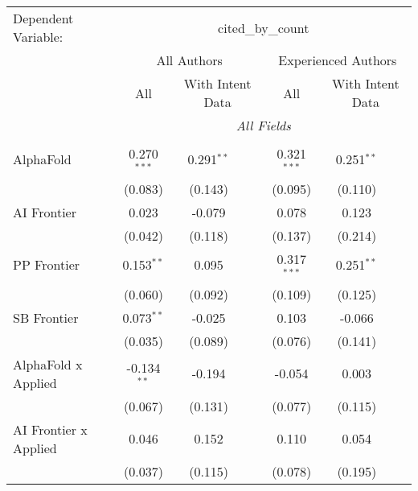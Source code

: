 \begingroup
\centering
\begin{tabular}{lcccccc}
   \tabularnewline \midrule \midrule
   Dependent Variable: & \multicolumn{6}{c}{cited\_by\_count}\\
 & \multicolumn{3}{c}{All Authors} & \multicolumn{3}{c}{Experienced Authors} \\
\cmidrule(lr){2-4} \cmidrule(lr){5-7}
 & \multicolumn{1}{c}{All} & \multicolumn{2}{c}{With Intent Data} & \multicolumn{1}{c}{All} & \multicolumn{2}{c}{With Intent Data} \\
\cmidrule(lr){2-2} \cmidrule(lr){3-4} \cmidrule(lr){5-5} \cmidrule(lr){6-7}
 & \multicolumn{6}{c}{\textit{All Fields}} \\ \\
   AlphaFold                      & 0.270$^{***}$ & 0.291$^{**}$ &                & 0.321$^{***}$ & 0.251$^{**}$ &   \\   
                                  & (0.083)       & (0.143)      &                & (0.095)       & (0.110)      &   \\   
   AI Frontier                    & 0.023         & -0.079       &                & 0.078         & 0.123        &   \\   
                                  & (0.042)       & (0.118)      &                & (0.137)       & (0.214)      &   \\   
   PP Frontier                    & 0.153$^{**}$  & 0.095        &                & 0.317$^{***}$ & 0.251$^{**}$ &   \\   
                                  & (0.060)       & (0.092)      &                & (0.109)       & (0.125)      &   \\   
   SB Frontier                    & 0.073$^{**}$  & -0.025       &                & 0.103         & -0.066       &   \\   
                                  & (0.035)       & (0.089)      &                & (0.076)       & (0.141)      &   \\   
   AlphaFold x Applied            & -0.134$^{**}$ & -0.194       &                & -0.054        & 0.003        &   \\   
                                  & (0.067)       & (0.131)      &                & (0.077)       & (0.115)      &   \\   
   AI Frontier x Applied          & 0.046         & 0.152        &                & 0.110         & 0.054        &   \\   
                                  & (0.037)       & (0.115)      &                & (0.078)       & (0.195)      &   \\   

\end{tabular}
